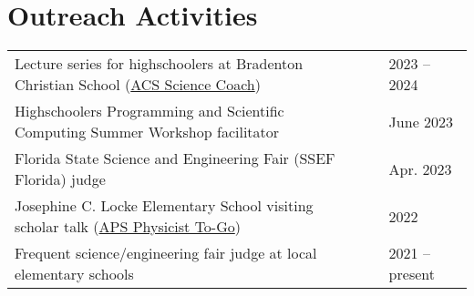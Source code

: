 \documentclass[letterpaper,11pt]{article}
\begin{document}
\section*{Outreach Activities}
\vspace{-1.0\baselineskip}
\begin{longtable}{@{}p{}p{} l@{}}
  Lecture series for highschoolers at Bradenton Christian School (\href{https://www.acs.org/education/outreach/science-coaches.html}{ACS Science Coach})    & & 2023 -- 2024    \\[3pt]
  Highschoolers Programming and Scientific Computing Summer Workshop facilitator                                                                            & & June 2023       \\[3pt]
  Florida State Science and Engineering Fair (SSEF Florida) judge                                                                                           & & Apr. 2023       \\[3pt]
  Josephine C. Locke Elementary School visiting scholar talk (\href{https://www.aps.org/programs/outreach/physiciststogo.cfm}{APS Physicist To-Go})         & & 2022            \\[3pt]
  Frequent science/engineering fair judge at local elementary schools                                                                                       & & 2021 -- present \\
\end{longtable}

\vspace{-0.58cm}
\begin{refsection}[talks]
 \nocite{*}
 \setlength\bibitemsep{0pt}
 \printbibliography[resetnumbers=true,type=inproceedings,title={Selected Presentations},heading=fix]
\end{refsection}

\vspace{-0.5cm}
\end{document}
